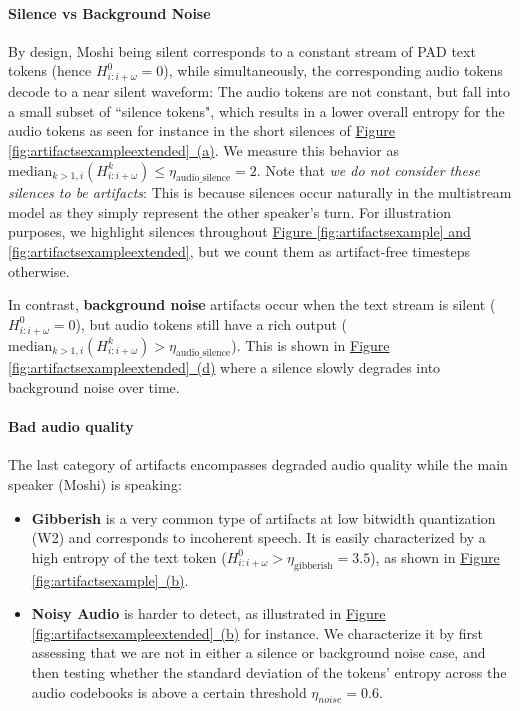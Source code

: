 \paragraph{Silence vs Background Noise} 
By design, Moshi being silent corresponds to a constant stream of PAD text tokens (hence $H^0_{i:i+\omega} = 0$), while simultaneously, the corresponding audio tokens decode to a near silent waveform: The audio tokens are not constant, but fall into a small subset of ``silence tokens", which results in a  lower overall entropy for the audio tokens as seen for instance in the short silences of \hyperref[fig:artifactsexampleextended]{Figure \ref{fig:artifactsexampleextended}~(a)}. We measure this behavior as  $\text{median}_{k > 1, i}(H^k_{i:i+\omega}) \leq \eta_{\text{audio\_silence}} = 2 $.
Note that \textit{we do not consider these silences to be artifacts}: This is because silences occur naturally in the multistream model as they simply represent the other speaker's turn. For illustration purposes, we highlight silences throughout \hyperref[fig:artifactsexampleextended]{Figure \ref{fig:artifactsexample} and \ref{fig:artifactsexampleextended}}, but we  count them as artifact-free timesteps otherwise.

In contrast, \textbf{background noise} artifacts occur when the text stream is silent ($H^0_{i:i+\omega} = 0$), but audio tokens still have a rich output  ($\text{median}_{k > 1, i}(H^k_{i:i+\omega}) > \eta_{\text{audio\_silence}} $). This is shown in \hyperref[fig:artifactsexampleextended]{Figure \ref{fig:artifactsexampleextended}~(d)} where a silence slowly degrades into background noise over time. 
\paragraph{Bad audio quality} The last category of artifacts encompasses degraded audio quality while the main speaker (Moshi) is speaking: 
\begin{itemize}
\item \textbf{Gibberish} is a very common type of artifacts at low bitwidth quantization (W2) and corresponds to incoherent speech. It is easily characterized by a high entropy of the text token ($H^0_{i:i+\omega} > \eta_{\text{gibberish}} = 3.5 $), as shown in \hyperref[fig:artifactsexample]{Figure \ref{fig:artifactsexample}~(b)}.

\item \textbf{Noisy Audio} is harder to detect, as illustrated in \hyperref[fig:artifactsexampleextended]{Figure \ref{fig:artifactsexampleextended}~(b)} for instance.
We characterize it by first assessing that we are not in either a silence or background noise case, and then testing whether the standard deviation of the tokens' entropy across the audio codebooks is above a certain threshold $\eta_{noise} = 0.6$. 
\end{itemize}


